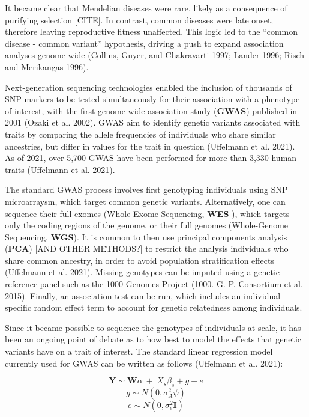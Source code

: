 \documentclass[
]{book}
\begin{document}
It became clear that Mendelian diseases were rare, likely as a consequence of purifying selection {[}CITE{]}. In contrast, common diseases were late onset, therefore leaving reproductive fitness unaffected. This logic led to the ``common disease - common variant'' hypothesis, driving a push to expand association analyses genome-wide (Collins, Guyer, and Chakravarti 1997; Lander 1996; Risch and Merikangas 1996).

Next-generation sequencing technologies enabled the inclusion of thousands of SNP markers to be tested simultaneously for their association with a phenotype of interest, with the first genome-wide association study (\textbf{GWAS}) published in 2001 (Ozaki et al. 2002). GWAS aim to identify genetic variants associated with traits by comparing the allele frequencies of individuals who share similar ancestries, but differ in values for the trait in question (Uffelmann et al. 2021). As of 2021, over 5,700 GWAS have been performed for more than 3,330 human traits (Uffelmann et al. 2021).

The standard GWAS process involves first genotyping individuals using SNP microarraysm, which target common genetic variants. Alternatively, one can sequence their full exomes (Whole Exome Sequencing, \textbf{WES} ), which targets only the coding regions of the genome, or their full genomes (Whole-Genome Sequencing, \textbf{WGS}). It is common to then use principal components analysis (\textbf{PCA}) {[}AND OTHER METHODS?{]} to restrict the analysis individuals who share common ancestry, in order to avoid population stratification effects (Uffelmann et al. 2021). Missing genotypes can be imputed using a genetic reference panel such as the 1000 Genomes Project (1000. G. P. Consortium et al. 2015). Finally, an association test can be run, which includes an individual-specific random effect term to account for genetic relatedness among individuals.

Since it became possible to sequence the genotypes of individuals at scale, it has been an ongoing point of debate as to how best to model the effects that genetic variants have on a trait of interest. The standard linear regression model currently used for GWAS can be written as follows (Uffelmann et al. 2021):

\begin{equation}
\textbf{Y} \sim \textbf{W} \alpha ~+~{X_s}{\beta_s} + g + e
\end{equation}
\begin{equation}
g \sim N(0,\sigma^2_A\psi)
\end{equation}
\begin{equation}
e \sim N(0,\sigma^2_e \textbf{I})
\end{equation}
\end{document}
